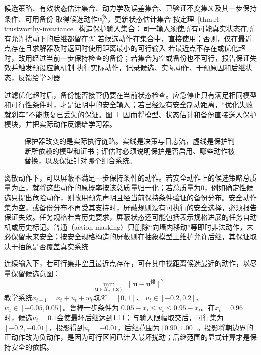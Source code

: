 \begin{algorithm}[带可行性检查的安全过滤]
  \label{alg:rl-trustworthy-filter}
  \begin{algorithmic}[1]
    \Require 候选策略、有效状态估计集合、动力学及误差集合、已验证不变集$\mathcal K$及其一步保持条件、可用备份
      \State 取得候选动作$\bm{u}^{\text{候}}_t$，更新状态估计集合
      \State 按定理~\ref{thm:rl-trustworthy-invariance}~构造保护输入集合：同一输入须使所有可能真实状态在所有允许扰动下的后继都留在$\mathcal K$
      \State 若候选动作在集合中，直接使用；否则，仅在最近点存在且求解器及时返回时使用距离最小的可行输入
      \State 若最近点不存在或优化超时，改用经过当前一步保持检查的备份；若集合为空或备份也不可行，报告保证失效并触发预设应急机制
      \State 执行实际动作，记录候选、实际动作、干预原因和后继状态，反馈给学习器
    \EndFor
  \end{algorithmic}
\end{algorithm}

过滤优化超时后，备份能否接管仍要在当前状态检查。应急停止只有满足相同模型和可行性条件时，才是证明中的安全输入；若已经没有安全制动距离，“优化失败就刹车”不能恢复已丢失的保证。图~\ref{fig:rl-trustworthy-filter}~因而将模型、状态估计和备份直接送入保护模块，并把实际动作反馈给学习器。

\begin{figure}[t]
  \centering
  
  \caption{保护器改变的是实际执行链路。实线是决策与日志流，虚线是保护判断所依赖的模型和证书；评估时必须说明保护是否启用、哪些动作被替换，以及保证针对哪个组合系统。}
  \label{fig:rl-trustworthy-filter}
\end{figure}

离散动作下，可以屏蔽不满足一步保持条件的动作。若安全动作上的候选策略总质量为正，就将这些动作的原概率按该总质量归一化；若总质量为0，例如确定性候选只提出危险动作，则改用预先声明且经当前保持条件验证的备份分布。安全动作集为空，或备份分布不再受其支持时，屏蔽规则没有可执行的安全选择，必须报告保证失效。任务规格若含历史要求，屏蔽状态还可能包括表示规格进展的任务自动机或历史标记。普通（action masking）只删除“向墙内移动”等即时非法动作，未必保留未来安全；按安全规格构造的屏蔽则在抽象模型上维护允许后继，其保证取决于抽象是否覆盖真实系统

连续输入下，若可行集非空且最近点存在，可在其中找距离候选最近的动作，以尽量保留候选意图：
\[
  \min_{\bm{u}\in\mathcal U_{\mathcal K}(\bm{x})}
          \|\bm{u}-\bm{u}^{\text{候}}\|^2.
\]
教学系统$x_{t+1}=x_t+u_t+w_t$取$\mathcal K=[0,1]$、
$u_t\in[-0.2,0.2]$、$w_t\in[-0.05,0.05]$。鲁棒一步条件为
$0.05-x_t\leq u_t\leq0.95-x_t$。在$x_t=0.96$时，候选$u_t=0.1$会使最坏后继达到1.11；与输入限幅取交后，可行集为$[-0.2,-0.01]$，投影得到$u_t=-0.01$，后继范围为$[0.90,1.00]$。投影将朝边界的正动作改为负动作，是因为可行区间已计入最坏扰动；后继范围的显式计算才是保持安全的依据。

